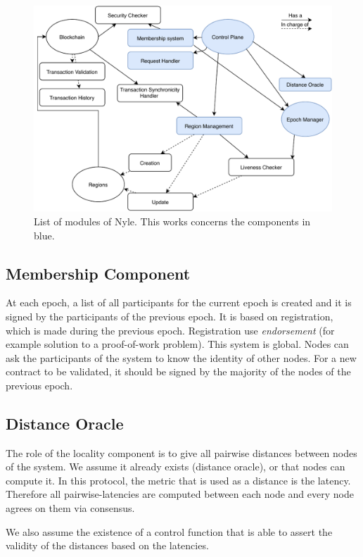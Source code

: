 \documentclass[a4paper,11pt,twoside=semi,openright]{report}
\begin{document}
\begin{figure}[!h]
\centering
\includegraphics[width=400pt]{figures/Nyle_components}
\caption{List of modules of Nyle. This works concerns the components in blue.}
\label{fig:modules}
\end{figure}

\subsection{Membership Component}

At each epoch, a list of all participants for the current epoch is created and
it is signed by the participants of the previous epoch. It is based on
registration, which is made during the previous epoch. Registration use
\textit{endorsement} (for example solution to a proof-of-work problem). This
system is global. Nodes can ask the participants of the system to know the
identity of other nodes. For a new contract to be validated, it should be
signed by the majority of the nodes of the previous epoch.

\subsection{Distance Oracle}

The role of the locality component is to give all pairwise distances between
nodes of the system. We assume it already exists (distance oracle), or that
nodes can compute it. In this protocol, the metric that is used as a distance
is the latency. Therefore all pairwise-latencies are computed between each node
and every node agrees on them via consensus.

We also assume the existence of a control function that is able to assert the
validity of the distances based on the latencies. 
 
\end{document}
